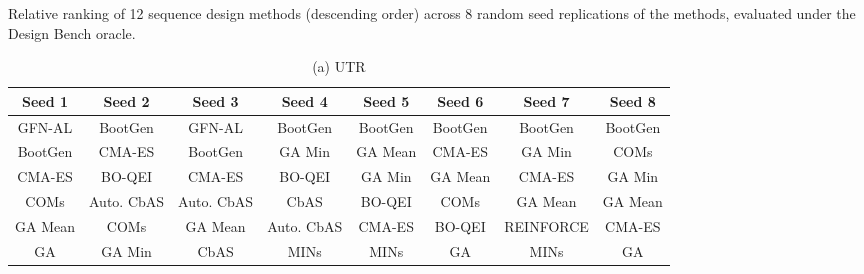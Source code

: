 \begin{table*}[h!]
  \caption{Relative ranking of 12 sequence design methods (descending order) across 8 random seed replications of the methods, evaluated under the Design Bench oracle.}
  \vspace{1ex}
  \label{tab:methods_robustness}
  \centering
    \begin{minipage}{.9\textwidth}
      \centering
      \caption*{(a) UTR }
      \begin{adjustbox}{width=\linewidth,center}
      \begin{tabular}{|c|c|c|c|c|c|c|c|}
        \toprule
            \textbf{Seed 1}                                           & \textbf{Seed 2}                                        & \textbf{Seed 3}                                          & \textbf{Seed 4}                    & \textbf{Seed 5} & \textbf{Seed 6} & \textbf{Seed 7} & \textbf{Seed 8}                                      \\ \midrule 
            \cellcolor[HTML]{F8E3A6}GFN-AL  & \cellcolor[HTML]{E6B8AF}BootGen & \cellcolor[HTML]{F8E3A6}GFN-AL  & \cellcolor[HTML]{E6B8AF}BootGen & \cellcolor[HTML]{E6B8AF}BootGen & \cellcolor[HTML]{E6B8AF}BootGen & \cellcolor[HTML]{E6B8AF}BootGen & \cellcolor[HTML]{E6B8AF}BootGen \\ 
\cellcolor[HTML]{E6B8AF}BootGen & \cellcolor[HTML]{EAD1DC}CMA-ES & \cellcolor[HTML]{E6B8AF}BootGen & \cellcolor[HTML]{CFE2F3}GA Min & \cellcolor[HTML]{F4CCCC}GA Mean  & \cellcolor[HTML]{EAD1DC}CMA-ES & \cellcolor[HTML]{CFE2F3}GA Min & \cellcolor[HTML]{C9DAF8}COMs  \\ 
\cellcolor[HTML]{EAD1DC}CMA-ES & \cellcolor[HTML]{B5DDCA}BO-QEI & \cellcolor[HTML]{EAD1DC}CMA-ES & \cellcolor[HTML]{B5DDCA}BO-QEI & \cellcolor[HTML]{CFE2F3}GA Min & \cellcolor[HTML]{F4CCCC}GA Mean  & \cellcolor[HTML]{EAD1DC}CMA-ES & \cellcolor[HTML]{CFE2F3}GA Min \\ 
\cellcolor[HTML]{C9DAF8}COMs  & \cellcolor[HTML]{D9EAD3}Auto. CbAS & \cellcolor[HTML]{D9EAD3}Auto. CbAS & \cellcolor[HTML]{FCE5CD}CbAS & \cellcolor[HTML]{B5DDCA}BO-QEI & \cellcolor[HTML]{C9DAF8}COMs  & \cellcolor[HTML]{F4CCCC}GA Mean  & \cellcolor[HTML]{F4CCCC}GA Mean  \\ 
\cellcolor[HTML]{F4CCCC}GA Mean  & \cellcolor[HTML]{C9DAF8}COMs  & \cellcolor[HTML]{F4CCCC}GA Mean  & \cellcolor[HTML]{D9EAD3}Auto. CbAS & \cellcolor[HTML]{EAD1DC}CMA-ES & \cellcolor[HTML]{B5DDCA}BO-QEI & \cellcolor[HTML]{FFF2CC}REINFORCE & \cellcolor[HTML]{EAD1DC}CMA-ES \\ 
\cellcolor[HTML]{D9D2E9}GA & \cellcolor[HTML]{CFE2F3}GA Min & \cellcolor[HTML]{FCE5CD}CbAS & \cellcolor[HTML]{D0E0E3}MINs & \cellcolor[HTML]{D0E0E3}MINs & \cellcolor[HTML]{D9D2E9}GA & \cellcolor[HTML]{D0E0E3}MINs & \cellcolor[HTML]{D9D2E9}GA \\ 

\end{tabular}
\end{adjustbox}
\end{minipage}
\end{table*}
